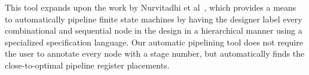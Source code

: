 This tool expands upon the work by Nurvitadhi et al~\cite{hoe:syn}, which provides a means to automatically pipeline finite state machines by having the designer label every combinational and sequential node in the design in a hierarchical manner using a specialized specification language. Our automatic pipelining tool does not require the user to annotate every node with a stage number, but automatically finds the close-to-optimal pipeline register placements.

